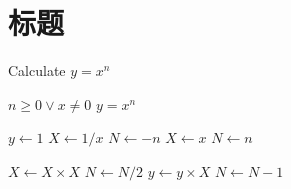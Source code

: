 \documentclass{sysuthesis}
\begin{document}
\chapter{标题}
\clearpage

\START
\showoutput

\begin{algorithm}[htb]
  \caption{Calculate $y = x^n$}
  \label{alg1}
  \begin{algorithmic}
    \REQUIRE $n \geq 0 \vee x \neq 0$
    \ENSURE $y = x^n$

    \STATE $y \leftarrow 1$
       \STATE $X \leftarrow 1 / x$
       \STATE $N \leftarrow -n$
    \ELSE
       \STATE $X \leftarrow x$
       \STATE $N \leftarrow n$
    \ENDIF

        \STATE $X \leftarrow X \times X$
        \STATE $N \leftarrow N / 2$
      \ELSE[$N$ is odd]
        \STATE $y \leftarrow y \times X$
        \STATE $N \leftarrow N - 1$
      \ENDIF
    \ENDWHILE
  \end{algorithmic}
\end{algorithm}

\clearpage
\OMIT
\end{document}

